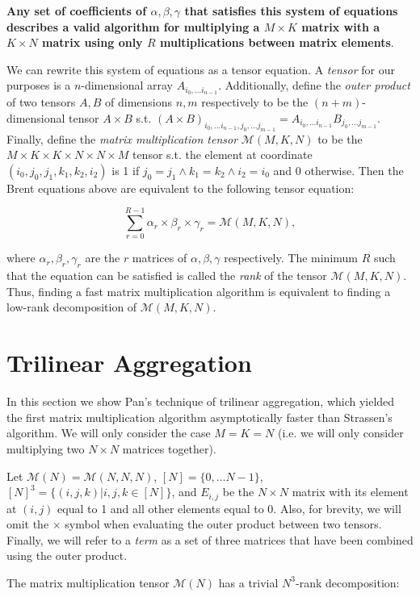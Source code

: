 \documentclass{article}
\begin{document}
\textbf{Any set of coefficients of $\alpha,\beta,\gamma$ that satisfies this system of equations describes a valid algorithm for multiplying a $M\times K$ matrix with a $K\times N$ matrix using only $R$ multiplications between matrix elements}.

We can rewrite this system of equations as a tensor equation. A \textit{tensor} for our purposes is a $n$-dimensional array $A_{i_0,\dots i_{n-1}}$. Additionally, define the \textit{outer product} of two tensors $A,B$ of dimensions $n,m$ respectively to be the $(n+m)$-dimensional tensor $A\times B$ s.t. $(A\times B)_{i_0,\dots i_{n-1},j_0,\dots j_{m-1}}=A_{i_0,\dots i_{n-1}}B_{j_0,\dots j_{m-1}}$. Finally, define the \textit{matrix multiplication tensor} $\mathcal{M}(M,K,N)$ to be the $M\times K\times K\times N\times N\times M$ tensor s.t. the element at coordinate $(i_0,j_0,j_1,k_1,k_2,i_2)$ is 1 if $j_0=j_1 \wedge k_1=k_2 \wedge i_2=i_0$ and 0 otherwise. Then the Brent equations above are equivalent to the following tensor equation:

\[\sum_{r=0}^{R-1} \alpha_r\times\beta_r\times\gamma_r=\mathcal{M}(M,K,N),\]

where $\alpha_r, \beta_r, \gamma_r$ are the $r$ matrices of $\alpha,\beta,\gamma$ respectively. The minimum $R$ such that the equation can be satisfied is called the \textit{rank} of the tensor $\mathcal{M}(M,K,N)$. Thus, finding a fast matrix multiplication algorithm is equivalent to finding a low-rank decomposition of $\mathcal{M}(M,K,N)$.

\section{Trilinear Aggregation}
In this section we show Pan's technique of trilinear aggregation, which yielded the first matrix multiplication algorithm asymptotically faster than Strassen's algorithm. We will only consider the case $M=K=N$ (i.e. we will only consider multiplying two $N\times N$ matrices together).

Let $\mathcal{M}(N)=\mathcal{M}(N,N,N)$, $[N]=\{0,\dots N-1\}$, $[N]^3=\{(i,j,k)|i,j,k\in [N]\}$, and $E_{i,j}$ be the $N\times N$ matrix with its element at $(i,j)$ equal to 1 and all other elements equal to 0. Also, for brevity, we will omit the $\times$ symbol when evaluating the outer product between two tensors. Finally, we will refer to a \textit{term} as a set of three matrices that have been combined using the outer product.

The matrix multiplication tensor $\mathcal{M}(N)$ has a trivial $N^3$-rank decomposition:
\end{document}
